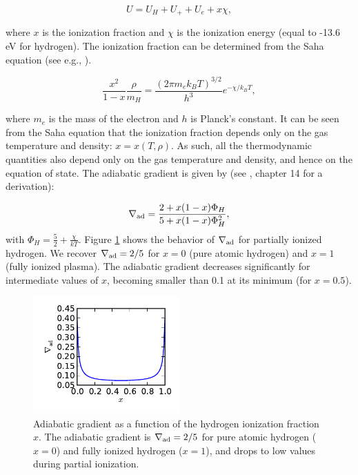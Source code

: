 \documentclass[apj]{emulateapj}
\newcommand{\delad}{\nabla_{\rm ad}}
\begin{document}
\begin{equation}
U=U_H+U_+ + U_e + x \chi,
\end{equation}

\noindent where $x$ is the ionization fraction and $\chi$ is the ionization energy (equal to -13.6 eV for hydrogen). The ionization fraction can be determined from the Saha equation (see e.g., \citealt{kippenhahn90}).

\begin{equation}
\label{eq:saha}
\frac{x^2}{1-x} \frac{\rho}{m_H}=\frac{(2 \pi m_e k_B T)^{3/2}}{h^3} e^{-\chi/k_B T},
\end{equation}

\noindent where $m_e$ is the mass of the electron and $h$ is Planck's constant. It can be seen from the Saha equation that the ionization fraction depends only on the gas temperature and density: $x=x(T, \rho)$. As such, all the thermodynamic quantities also depend only on the gas temperature and density, and hence on the equation of state. The adiabatic gradient is given by (see \citealt{kippenhahn90}, chapter 14 for a derivation):

\begin{equation}
\delad=\frac{2+x (1-x) \Phi_H}{5+x (1-x) \Phi_H^2},
\end{equation} 
with $\Phi_H=\frac{5}{2}+\frac{\chi}{k T}$. Figure \ref{fig:deladion} shows the behavior of $\delad$ for partially ionized hydrogen. We recover $\delad=2/5$ for $x=0$ (pure atomic hydrogen) and $x=1$ (fully ionized plasma). The adiabatic gradient decreases significantly for intermediate values of $x$, becoming smaller than 0.1 at its minimum (for $x=0.5$). 

\begin{figure}[h]
\centering
\includegraphics[width=0.5\textwidth]{../../figs/ModelAtmospheres/RadSelfGravRealEOS/PaperFigs/delad_ionization.pdf}
\caption{Adiabatic gradient as a function of the hydrogen ionization fraction $x$. The adiabatic gradient is $\delad=2/5$ for pure atomic hydrogen ($x=0$) and fully ionized hydrogen ($x=1$), and drops to low values during partial ionization.}
\label{fig:deladion}
\end{figure}
\end{document}
